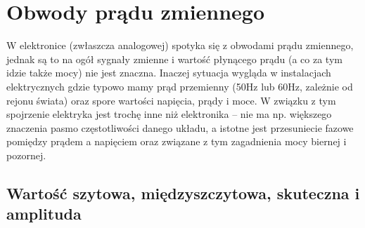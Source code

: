 % 
% 
% 
% 

\section{Obwody prądu zmiennego}

W elektronice (zwłaszcza analogowej) spotyka się z obwodami prądu zmiennego, jednak są to na ogół sygnały zmienne i wartość płynącego prądu (a co za tym idzie także mocy) nie jest znaczna. Inaczej sytuacja wygląda w instalacjach elektrycznych gdzie typowo mamy prąd przemienny (50Hz lub 60Hz, zależnie od rejonu świata) oraz spore wartości napięcia, prądy i moce. W związku z tym spojrzenie elektryka jest trochę inne niż elektronika – nie ma np. większego znaczenia pasmo częstotliwości danego układu, a istotne jest przesuniecie fazowe pomiędzy prądem a napięciem oraz związane z tym zagadnienia mocy biernej i pozornej.

\subsection{Wartość szytowa, międzyszczytowa, skuteczna i amplituda}

